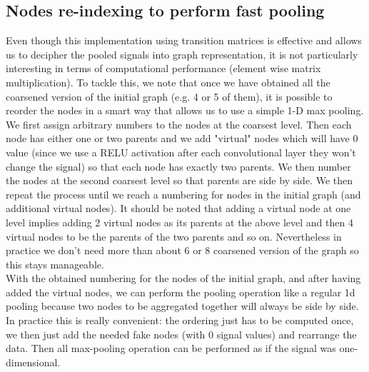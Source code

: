 \subsection{Nodes re-indexing to perform fast pooling}

Even though this implementation using transition matrices is effective and allows us to decipher the pooled signals into graph representation, it is not particularly interesting in terms of computational performance (element wise matrix multiplication). To tackle this, we note that once we have obtained all the coarsened version of the initial graph (e.g. 4 or 5 of them), it is possible to reorder the nodes in a smart way that allows us to use a simple 1-D max pooling. We first assign arbitrary numbers to the nodes at the coarsest level. Then each node has either one or two parents and we add "virtual" nodes which will have 0 value (since we use a RELU activation after each convolutional layer they won't change the signal) so that each node has exactly two parents. We then number the nodes at the second coarsest level so that parents are side by side. We then repeat the process until we reach a numbering for nodes in the initial graph (and additional virtual nodes). It should be noted that adding a virtual node at one level implies adding 2 virtual nodes as its parents at the above level and then 4 virtual nodes to be the parents of the two parents and so on. Nevertheless in practice we don't need more than about 6 or 8 coarsened version of the graph so this stays manageable.\\

With the obtained numbering for the nodes of the initial graph, and after having added the virtual nodes, we can perform the pooling operation like a regular 1d pooling because two nodes to be aggregated together will always be side by side. In practice this is really convenient: the ordering just has to be computed once, we then just add the needed fake nodes (with 0 signal values) and rearrange the data. Then all max-pooling operation can be performed as if the signal was one-dimensional.